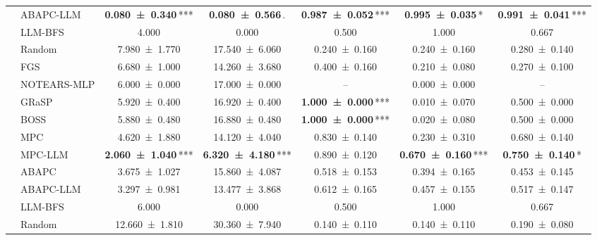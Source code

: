 \begin{table}[t]
{\begin{tabular}{llccccc}
     & ABAPC-LLM & {\bfseries \num{0.080 +- 0.340}}\,\textnormal{***} & {\bfseries \num{0.080 +- 0.566}}\,\textnormal{.} & {\bfseries \num{0.987 +- 0.052}}\,\textnormal{***} & {\bfseries \num{0.995 +- 0.035}}\,\textnormal{*} & {\bfseries \num{0.991 +- 0.041}}\,\textnormal{***} \\
     & LLM-BFS & \num{4.000} & \num{0.000} & \num{0.500} & \num{1.000} & \num{0.667} \\
    \midrule
     & Random & \num{7.980 +- 1.770} & \num{17.540 +- 6.060} & \num{0.240 +- 0.160} & \num{0.240 +- 0.160} & \num{0.280 +- 0.140} \\
     & FGS & \num{6.680 +- 1.000} & \num{14.260 +- 3.680} & \num{0.400 +- 0.160} & \num{0.210 +- 0.080} & \num{0.270 +- 0.100} \\
     & NOTEARS-MLP & \num{6.000 +- 0.000} & \num{17.000 +- 0.000} & -- & \num{0.000 +- 0.000} & -- \\
     & GRaSP & \num{5.920 +- 0.400} & \num{16.920 +- 0.400} & {\bfseries \num{1.000 +- 0.000}}\,\textnormal{***} & \num{0.010 +- 0.070} & \num{0.500 +- 0.000} \\
     & BOSS & \num{5.880 +- 0.480} & \num{16.880 +- 0.480} & {\bfseries \num{1.000 +- 0.000}}\,\textnormal{***} & \num{0.020 +- 0.080} & \num{0.500 +- 0.000} \\
     & MPC & \num{4.620 +- 1.880} & \num{14.120 +- 4.040} & \num{0.830 +- 0.140} & \num{0.230 +- 0.310} & \num{0.680 +- 0.140} \\
     & MPC-LLM & {\bfseries \num{2.060 +- 1.040}}\,\textnormal{***} & {\bfseries \num{6.320 +- 4.180}}\,\textnormal{***} & \num{0.890 +- 0.120} & {\bfseries \num{0.670 +- 0.160}}\,\textnormal{***} & {\bfseries \num{0.750 +- 0.140}}\,\textnormal{*} \\
     & ABAPC & \num{3.675 +- 1.027} & \num{15.860 +- 4.087} & \num{0.518 +- 0.153} & \num{0.394 +- 0.165} & \num{0.453 +- 0.145} \\
     & ABAPC-LLM & \num{3.297 +- 0.981} & \num{13.477 +- 3.868} & \num{0.612 +- 0.165} & \num{0.457 +- 0.155} & \num{0.517 +- 0.147} \\
     & LLM-BFS & \num{6.000} & \num{0.000} & \num{0.500} & \num{1.000} & \num{0.667} \\
    \midrule
     & Random & \num{12.660 +- 1.810} & \num{30.360 +- 7.940} & \num{0.140 +- 0.110} & \num{0.140 +- 0.110} & \num{0.190 +- 0.080} \\

\end{tabular}}
\end{table}
